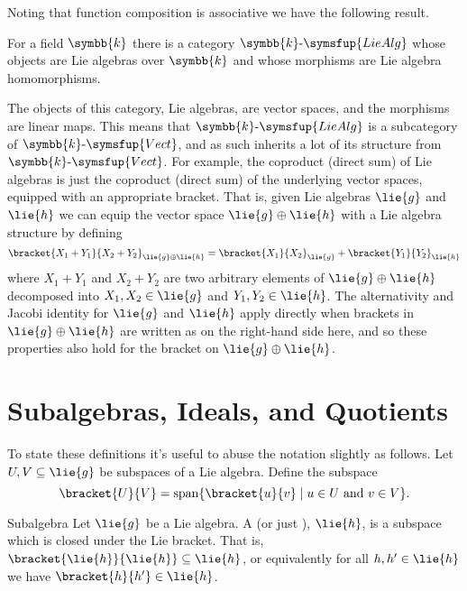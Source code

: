 \documentclass[fleqn]{NotesClass}
\makeatletter
\renewcommand{\field}{\symbb{k}}
\newcommand{\c@egory}[1]{\symsfup{#1}}
\newcommand{\Vect}[1][\field]{#1\text{-}\c@egory{Vect}}
\newcommand{\LieAlg}[1][\field]{#1\text{-}\c@egory{LieAlg}}
\DeclareMathOperator{\Span}{span}
\makeatother
\begin{document}
    Noting that function composition is associative we have the following result.
    
    \begin{crl}{}{}
        For a field \(\field\) there is a category \(\LieAlg\) whose objects are Lie algebras over \(\field\) and whose morphisms are Lie algebra homomorphisms.
    \end{crl}
    
    The objects of this category, Lie algebras, are vector spaces, and the morphisms are linear maps.
    This means that \(\LieAlg\) is a subcategory of \(\Vect\), and as such inherits a lot of its structure from \(\Vect\).
    For example, the coproduct (direct sum) of Lie algebras is just the coproduct (direct sum) of the underlying vector spaces, equipped with an appropriate bracket.
    That is, given Lie algebras \(\lie{g}\) and \(\lie{h}\) we can equip the vector space \(\lie{g} \oplus \lie{h}\) with a Lie algebra structure by defining
    \begin{equation}
        \bracket{X_1 + Y_1}{X_2 + Y_2}_{\lie{g} \oplus \lie{h}} = \bracket{X_1}{X_2}_{\lie{g}} + \bracket{Y_1}{Y_2}_{\lie{h}}
    \end{equation} 
    where \(X_1 + Y_1\) and \(X_2 + Y_2\) are two arbitrary elements of \(\lie{g} \oplus \lie{h}\) decomposed into \(X_1, X_2 \in \lie{g}\) and \(Y_1, Y_2 \in \lie{h}\).
    The alternativity and Jacobi identity for \(\lie{g}\) and \(\lie{h}\) apply directly when brackets in \(\lie{g} \oplus \lie{h}\) are written as on the right-hand side here, and so these properties also hold for the bracket on \(\lie{g} \oplus \lie{h}\).
    
    \section{Subalgebras, Ideals, and Quotients}
    To state these definitions it's useful to abuse the notation slightly as follows.
    Let \(U, V \subseteq \lie{g}\) be subspaces of a Lie algebra.
    Define the subspace
    \begin{equation}
        \bracket{U}{V} = \Span\{\bracket{u}{v} \mid u \in U \text{ and } v \in V\}.
    \end{equation}
    
    \begin{dfn}{Subalgebra}{}
        Let \(\lie{g}\) be a Lie algebra.
        A  (or just ), \(\lie{h}\), is a subspace which is closed under the Lie bracket.
        That is, \(\bracket{\lie{h}}{\lie{h}} \subseteq \lie{h}\), or equivalently for all \(h, h' \in \lie{h}\) we have \(\bracket{h}{h'} \in \lie{h}\).
    \end{dfn}
    
\end{document}
